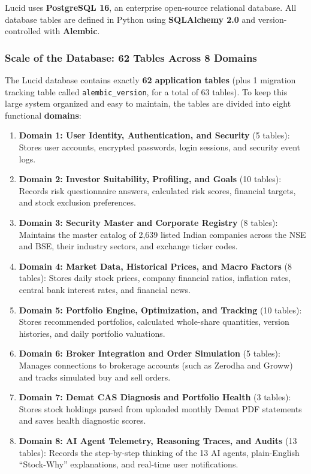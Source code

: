 Lucid uses \textbf{PostgreSQL 16}, an enterprise open-source relational database. All database tables are defined in Python using \textbf{SQLAlchemy 2.0} and version-controlled with \textbf{Alembic}.

\subsubsection{Scale of the Database: 62 Tables Across 8 Domains}
The Lucid database contains exactly \textbf{62 application tables} (plus 1 migration tracking table called \texttt{alembic\_version}, for a total of 63 tables). To keep this large system organized and easy to maintain, the tables are divided into eight functional \textbf{domains}:
\begin{enumerate}
    \item \textbf{Domain 1: User Identity, Authentication, and Security} (5 tables): Stores user accounts, encrypted passwords, login sessions, and security event logs.
    \item \textbf{Domain 2: Investor Suitability, Profiling, and Goals} (10 tables): Records risk questionnaire answers, calculated risk scores, financial targets, and stock exclusion preferences.
    \item \textbf{Domain 3: Security Master and Corporate Registry} (8 tables): Maintains the master catalog of 2,639 listed Indian companies across the NSE and BSE, their industry sectors, and exchange ticker codes.
    \item \textbf{Domain 4: Market Data, Historical Prices, and Macro Factors} (8 tables): Stores daily stock prices, company financial ratios, inflation rates, central bank interest rates, and financial news.
    \item \textbf{Domain 5: Portfolio Engine, Optimization, and Tracking} (10 tables): Stores recommended portfolios, calculated whole-share quantities, version histories, and daily portfolio valuations.
    \item \textbf{Domain 6: Broker Integration and Order Simulation} (5 tables): Manages connections to brokerage accounts (such as Zerodha and Groww) and tracks simulated buy and sell orders.
    \item \textbf{Domain 7: Demat CAS Diagnosis and Portfolio Health} (3 tables): Stores stock holdings parsed from uploaded monthly Demat PDF statements and saves health diagnostic scores.
    \item \textbf{Domain 8: AI Agent Telemetry, Reasoning Traces, and Audits} (13 tables): Records the step-by-step thinking of the 13 AI agents, plain-English ``Stock-Why'' explanations, and real-time user notifications.
\end{enumerate}

